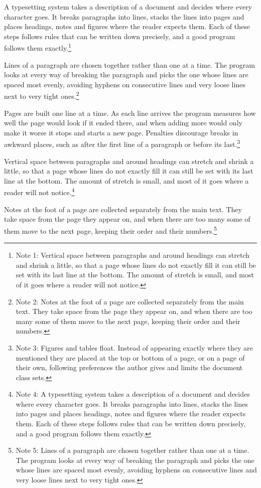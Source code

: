 \documentclass{article}
\begin{document}
A typesetting system takes a description of a document and decides where every character goes. It breaks paragraphs into lines, stacks the lines into pages and places headings, notes and figures where the reader expects them. Each of these steps follows rules that can be written down precisely, and a good program follows them exactly.\footnote{Note 1: Vertical space between paragraphs and around headings can stretch and shrink a little, so that a page whose lines do not exactly fill it can still be set with its last line at the bottom. The amount of stretch is small, and most of it goes where a reader will not notice.}

Lines of a paragraph are chosen together rather than one at a time. The program looks at every way of breaking the paragraph and picks the one whose lines are spaced most evenly, avoiding hyphens on consecutive lines and very loose lines next to very tight ones.\footnote{Note 2: Notes at the foot of a page are collected separately from the main text. They take space from the page they appear on, and when there are too many some of them move to the next page, keeping their order and their numbers.}

Pages are built one line at a time. As each line arrives the program measures how well the page would look if it ended there, and when adding more would only make it worse it stops and starts a new page. Penalties discourage breaks in awkward places, such as after the first line of a paragraph or before its last.\footnote{Note 3: Figures and tables float. Instead of appearing exactly where they are mentioned they are placed at the top or bottom of a page, or on a page of their own, following preferences the author gives and limits the document class sets.}

Vertical space between paragraphs and around headings can stretch and shrink a little, so that a page whose lines do not exactly fill it can still be set with its last line at the bottom. The amount of stretch is small, and most of it goes where a reader will not notice.\footnote{Note 4: A typesetting system takes a description of a document and decides where every character goes. It breaks paragraphs into lines, stacks the lines into pages and places headings, notes and figures where the reader expects them. Each of these steps follows rules that can be written down precisely, and a good program follows them exactly.}

Notes at the foot of a page are collected separately from the main text. They take space from the page they appear on, and when there are too many some of them move to the next page, keeping their order and their numbers.\footnote{Note 5: Lines of a paragraph are chosen together rather than one at a time. The program looks at every way of breaking the paragraph and picks the one whose lines are spaced most evenly, avoiding hyphens on consecutive lines and very loose lines next to very tight ones.}
\end{document}
